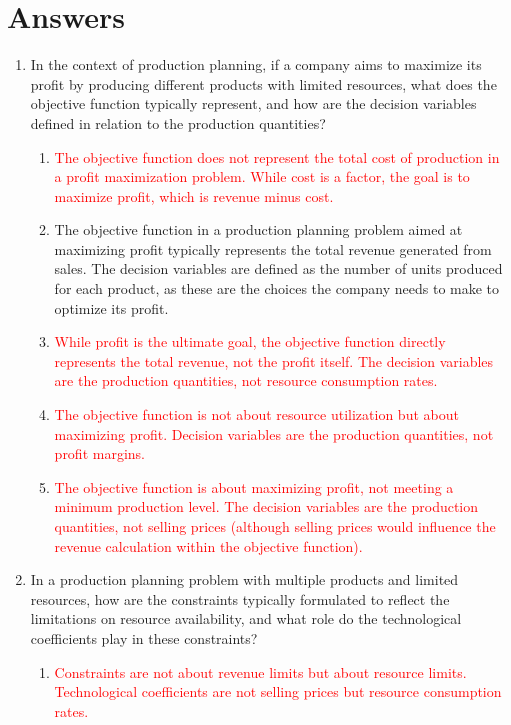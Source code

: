 \documentclass{article}%
\newcommand{\incorrect}[1]{\textcolor{red}{#1}}
\begin{document}
\section{Answers}%
\label{sec:Answers}%
\begin{enumerate}%
\item In the context of production planning, if a company aims to maximize its profit by producing different products with limited resources, what does the objective function typically represent, and how are the decision variables defined in relation to the production quantities?%
\begin{enumerate}%
\item \incorrect{The objective function does not represent the total cost of production in a profit maximization problem.  While cost is a factor, the goal is to maximize profit, which is revenue minus cost.}%
\item The objective function in a production planning problem aimed at maximizing profit typically represents the total revenue generated from sales. The decision variables are defined as the number of units produced for each product, as these are the choices the company needs to make to optimize its profit.%
\item \incorrect{While profit is the ultimate goal, the objective function directly represents the total revenue, not the profit itself. The decision variables are the production quantities, not resource consumption rates.}%
\item \incorrect{The objective function is not about resource utilization but about maximizing profit. Decision variables are the production quantities, not profit margins.}%
\item \incorrect{The objective function is about maximizing profit, not meeting a minimum production level.  The decision variables are the production quantities, not selling prices (although selling prices would influence the revenue calculation within the objective function).}%
\end{enumerate}%
\vspace{1em}%
\item In a production planning problem with multiple products and limited resources, how are the constraints typically formulated to reflect the limitations on resource availability, and what role do the technological coefficients play in these constraints?%
\begin{enumerate}%
\item \incorrect{Constraints are not about revenue limits but about resource limits. Technological coefficients are not selling prices but resource consumption rates.}%

\end{enumerate}
\end{enumerate}
\end{document}
